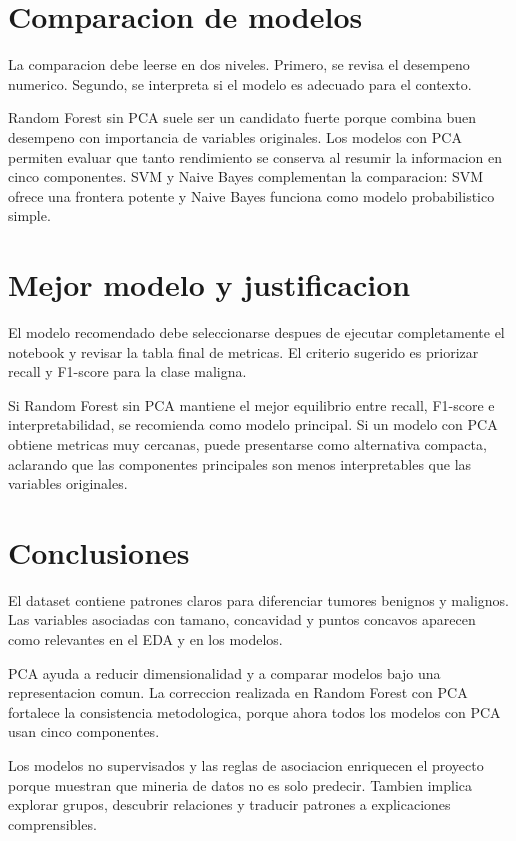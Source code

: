 \documentclass[12pt,letterpaper]{article}
\begin{document}
\section{Comparacion de modelos}

La comparacion debe leerse en dos niveles. Primero, se revisa el desempeno numerico. Segundo, se interpreta si el modelo es adecuado para el contexto.

Random Forest sin PCA suele ser un candidato fuerte porque combina buen desempeno con importancia de variables originales. Los modelos con PCA permiten evaluar que tanto rendimiento se conserva al resumir la informacion en cinco componentes. SVM y Naive Bayes complementan la comparacion: SVM ofrece una frontera potente y Naive Bayes funciona como modelo probabilistico simple.

\section{Mejor modelo y justificacion}

El modelo recomendado debe seleccionarse despues de ejecutar completamente el notebook y revisar la tabla final de metricas. El criterio sugerido es priorizar recall y F1-score para la clase maligna.

Si Random Forest sin PCA mantiene el mejor equilibrio entre recall, F1-score e interpretabilidad, se recomienda como modelo principal. Si un modelo con PCA obtiene metricas muy cercanas, puede presentarse como alternativa compacta, aclarando que las componentes principales son menos interpretables que las variables originales.

\section{Conclusiones}

El dataset contiene patrones claros para diferenciar tumores benignos y malignos. Las variables asociadas con tamano, concavidad y puntos concavos aparecen como relevantes en el EDA y en los modelos.

PCA ayuda a reducir dimensionalidad y a comparar modelos bajo una representacion comun. La correccion realizada en Random Forest con PCA fortalece la consistencia metodologica, porque ahora todos los modelos con PCA usan cinco componentes.

Los modelos no supervisados y las reglas de asociacion enriquecen el proyecto porque muestran que mineria de datos no es solo predecir. Tambien implica explorar grupos, descubrir relaciones y traducir patrones a explicaciones comprensibles.
\end{document}
